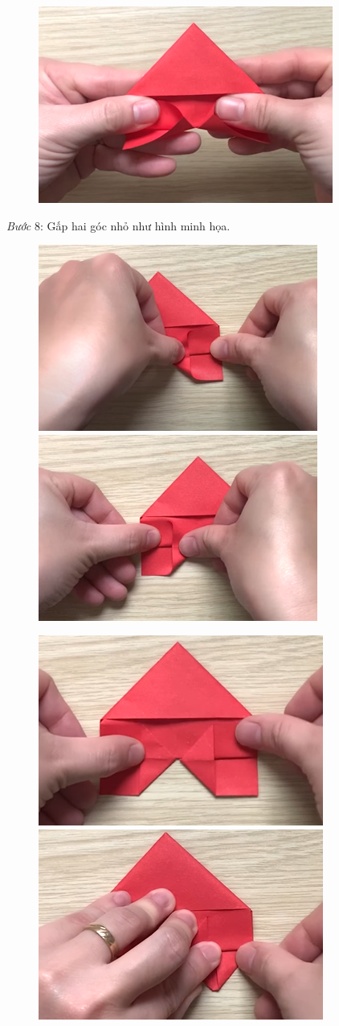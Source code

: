 \begin{multicols}{2}
\begin{figure}[H]
		\vspace*{1pt}
		\includegraphics[width=0.65\linewidth]{34}
	\end{figure}
	\vskip 0.1cm
	\columnbreak
	\textit{Bước} $8$: Gấp hai góc nhỏ như hình minh họa.
	\begin{figure}[H]
		\vspace*{-5pt}
		\centering
		\captionsetup{labelformat= empty, justification=centering}
		\includegraphics[height= 0.327\linewidth]{35}
		\includegraphics[height= 0.327\linewidth]{36}
		
		\vspace*{1pt}
		\includegraphics[height= 0.327\linewidth]{37}
		\includegraphics[height= 0.327\linewidth]{38}
		

\end{figure}
\end{multicols}
